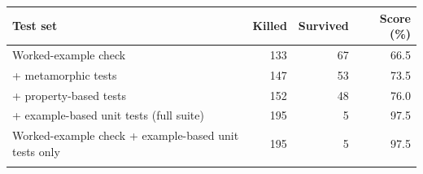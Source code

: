 \footnotesize
\begin{tabular}{@{}L{6.4cm}rrr@{}}
\toprule
Test set & Killed & Survived & Score (\%)\\
\midrule
Worked-example check & 133 & 67 & 66.5\\
+ metamorphic tests & 147 & 53 & 73.5\\
+ property-based tests & 152 & 48 & 76.0\\
+ example-based unit tests (full suite) & 195 & 5 & 97.5\\
Worked-example check + example-based unit tests only & 195 & 5 & 97.5\\
\botrule
\end{tabular}
